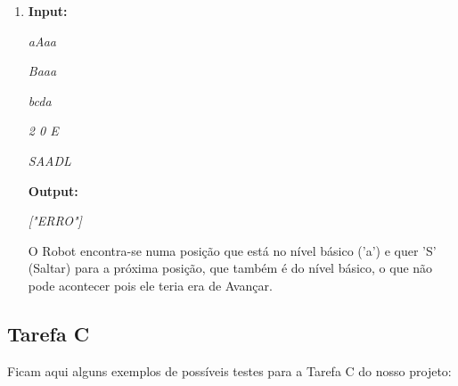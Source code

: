 \documentclass[a4paper, 12pt, portuguese]{article}
\begin{document}
\begin{enumerate}
\begin{enumerate}
\item

\textbf{Input:}

\vspace{2 mm}

\textit{aAaa}

\textit{Baaa}

\textit{bcda}

\textit{2 0 E}

\textit{SAADL}

\vspace{2 mm}

\textbf{Output:}

\vspace{2 mm}

\textit{["ERRO"]}

\vspace{4 mm}

O Robot encontra-se numa posição que está no nível básico ('a') e quer 'S' (Saltar) para a próxima posição, que também é do nível básico, o que não pode acontecer pois ele teria era de Avançar.

\end{enumerate}
\end{enumerate}

\subsection{Tarefa C}

Ficam aqui alguns exemplos de possíveis testes para a Tarefa C do nosso projeto:
\end{document}
